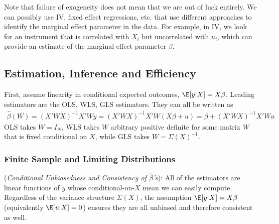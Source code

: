 \documentclass[12pt]{article}
\theoremstyle{plain}
\theoremstyle{definition}
\theoremstyle{remark}
\begin{document}
Note that failure of exogeneity does not mean that we are out of
luck entirely.
We can possibly use IV, fixed effect regressions, etc.
that use different approaches to identify the marginal effect
parameter in the data.
For example, in IV, we look for an instrument that is correlated
with $X_i$ but uncorrelated with $u_i$, which can provide an
estimate of the marginal effect parameter $\beta$.



\clearpage
\subsection{Estimation, Inference and Efficiency}

First, assume linearity in conditional expected outcomes,
$\E[y|X]=X\beta$.
Leading estimators are the OLS, WLS, GLS estimators.
They can all be written as
\begin{align*}
  \hat{\beta}(W)
  = (X'WX)^{-1}X'Wy
  = (X'WX)^{-1}X'W(X\beta + u)
  = \beta + (X'WX)^{-1}X'Wu
\end{align*}
OLS takes $W=I_N$, WLS takes $W$ arbitrary positive definite for
some matrix $W$ that is fixed conditional on $X$, while GLS takes
$W=\Sigma(X)^{-1}$.

\subsubsection{Finite Sample and Limiting Distributions}

(\emph{Conditional Unbiasedness and Consistency of $\hat{\beta}$'s}):
All of the estimators are linear functions of $y$ whose
conditional-on-$X$ mean we can easily compute.
Regardless of the variance structure $\Sigma(X)$,
the assumption $\E[y|X]=X\beta$ (equivalently $\E[u|X]=0$)
ensures they are all unbiased and therefore consistent as well.
\end{document}
